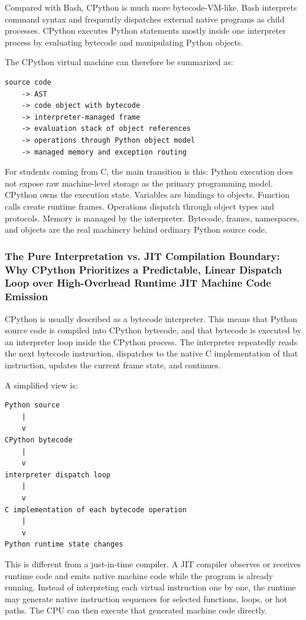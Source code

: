 Compared with Bash, CPython is much more bytecode-VM-like. Bash interprets command syntax and frequently dispatches external native programs as child processes. CPython executes Python statements mostly inside one interpreter process by evaluating bytecode and manipulating Python objects.

The CPython virtual machine can therefore be summarized as:

\begin{verbatim}
source code
    -> AST
    -> code object with bytecode
    -> interpreter-managed frame
    -> evaluation stack of object references
    -> operations through Python object model
    -> managed memory and exception routing
\end{verbatim}

For students coming from C, the main transition is this: Python execution does not expose raw machine-level storage as the primary programming model. CPython owns the execution state. Variables are bindings to objects. Function calls create runtime frames. Operations dispatch through object types and protocols. Memory is managed by the interpreter. Bytecode, frames, namespaces, and objects are the real machinery behind ordinary Python source code.


\subsubsection{The Pure Interpretation vs. JIT Compilation Boundary: Why CPython Prioritizes a Predictable, Linear Dispatch Loop over High-Overhead Runtime JIT Machine Code Emission}

CPython is usually described as a bytecode interpreter. This means that Python source code is compiled into CPython bytecode, and that bytecode is executed by an interpreter loop inside the CPython process. The interpreter repeatedly reads the next bytecode instruction, dispatches to the native C implementation of that instruction, updates the current frame state, and continues.

A simplified view is:

\begin{verbatim}
Python source
    |
    v
CPython bytecode
    |
    v
interpreter dispatch loop
    |
    v
C implementation of each bytecode operation
    |
    v
Python runtime state changes
\end{verbatim}

This is different from a just-in-time compiler. A JIT compiler observes or receives runtime code and emits native machine code while the program is already running. Instead of interpreting each virtual instruction one by one, the runtime may generate native instruction sequences for selected functions, loops, or hot paths. The CPU can then execute that generated machine code directly.

